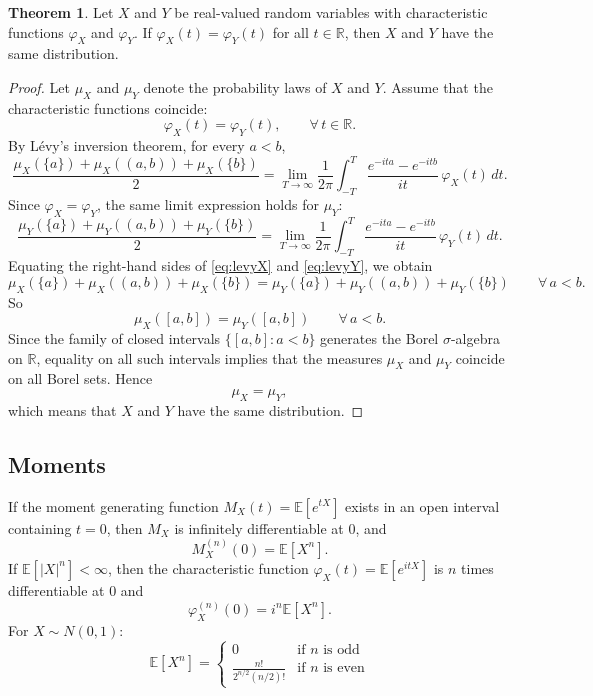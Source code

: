 \documentclass[11pt,a4paper]{article}
\theoremstyle{definition}
\newtheorem{theorem}{Theorem}[section]
\begin{document}
\begin{theorem}
Let $X$ and $Y$ be real-valued random variables with characteristic 
functions $\varphi_X$ and $\varphi_Y$.  
If $\varphi_X(t) = \varphi_Y(t)$ for all $t \in \mathbb{R}$, 
then $X$ and $Y$ have the same distribution.
\end{theorem}

\begin{proof}
Let $\mu_X$ and $\mu_Y$ denote the probability laws of $X$ and $Y$.
Assume that the characteristic functions coincide:
\[
\varphi_X(t) = \varphi_Y(t), \qquad \forall\, t\in\mathbb{R}.
\]
By Lévy's inversion theorem, for every $a < b$,
\[
\frac{\mu_X(\{a\}) + \mu_X((a,b)) + \mu_X(\{b\})}{2}
=
\lim_{T\to\infty}
\frac{1}{2\pi} \int_{-T}^{T}
\frac{e^{-ita} - e^{-itb}}{it}\,\varphi_X(t)\,dt.
\tag{1}
\label{eq:levyX}
\]
Since $\varphi_X = \varphi_Y$, the same limit expression holds for $\mu_Y$:
\[
\frac{\mu_Y(\{a\}) + \mu_Y((a,b)) + \mu_Y(\{b\})}{2}
=
\lim_{T\to\infty}
\frac{1}{2\pi} \int_{-T}^{T}
\frac{e^{-ita} - e^{-itb}}{it}\,\varphi_Y(t)\,dt.
\tag{2}
\label{eq:levyY}
\]
Equating the right-hand sides of \eqref{eq:levyX} and \eqref{eq:levyY}, we obtain
\[
\mu_X(\{a\}) + \mu_X((a,b)) + \mu_X(\{b\})
=
\mu_Y(\{a\}) + \mu_Y((a,b)) + \mu_Y(\{b\})
\qquad \forall\, a<b.
\]
So
\[
\mu_X([a,b]) = \mu_Y([a,b]) \qquad \forall\, a<b.
\]
Since the family of closed intervals $\{[a,b] : a<b\}$ generates the Borel
$\sigma$-algebra on $\mathbb{R}$, equality on all such intervals implies 
that the measures $\mu_X$ and $\mu_Y$ coincide on all Borel sets.  
Hence
\[
\mu_X = \mu_Y,
\]
which means that $X$ and $Y$ have the same distribution.
\end{proof}



\subsection{Moments}
If the moment generating function $M_X(t)=\mathbb{E}[e^{tX}]$ 
exists in an open interval containing $t=0$, then $M_X$ is 
infinitely differentiable at $0$, and
\[
M_X^{(n)}(0) = \mathbb{E}[X^n].
\]
If $\mathbb{E}[|X|^n] < \infty$, then the characteristic function 
$\varphi_X(t)=\mathbb{E}[e^{itX}]$ is $n$ times differentiable at $0$ and
\[
\varphi_X^{(n)}(0) = i^n \mathbb{E}[X^n].
\]
For $X \sim N(0,1)$:
\[\mathbb{E}[X^n] = \begin{cases}
0 & \text{if } n \text{ is odd}\\
\frac{n!}{2^{n/2} (n/2)!} & \text{if } n \text{ is even}
\end{cases}\]
\end{document}
